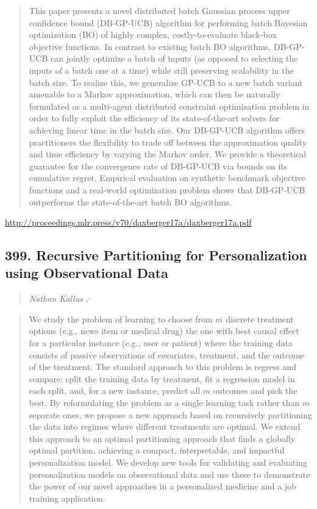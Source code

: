 \documentclass{article}
\begin{document}
\begin{quote}
    This paper presents a novel distributed batch Gaussian process upper confidence bound (DB-GP-UCB) algorithm for performing batch Bayesian optimization (BO) of highly complex, costly-to-evaluate black-box objective functions. In contrast to existing batch BO algorithms, DB-GP-UCB can jointly optimize a batch of inputs (as opposed to selecting the inputs of a batch one at a time) while still preserving scalability in the batch size. To realize this, we generalize GP-UCB to a new batch variant amenable to a Markov approximation, which can then be naturally formulated as a multi-agent distributed constraint optimization problem in order to fully exploit the efficiency of its state-of-the-art solvers for achieving linear time in the batch size. Our DB-GP-UCB algorithm offers practitioners the flexibility to trade off between the approximation quality and time efficiency by varying the Markov order. We provide a theoretical guarantee for the convergence rate of DB-GP-UCB via bounds on its cumulative regret. Empirical evaluation on synthetic benchmark objective functions and a real-world optimization problem shows that DB-GP-UCB outperforms the state-of-the-art batch BO algorithms.  \end{quote}

\href{http://proceedings.mlr.press/v70/daxberger17a/daxberger17a.pdf}{http://proceedings.mlr.press/v70/daxberger17a/daxberger17a.pdf}

\subsection{399. Recursive Partitioning for Personalization using Observational Data}

\begin{quote}
\footnotesize{\textit{Nathan Kallus ;}}
\end{quote}

\begin{quote}
    We study the problem of learning to choose from $m$ discrete treatment options (e.g., news item or medical drug) the one with best causal effect for a particular instance (e.g., user or patient) where the training data consists of passive observations of covariates, treatment, and the outcome of the treatment. The standard approach to this problem is regress and compare: split the training data by treatment, fit a regression model in each split, and, for a new instance, predict all $m$ outcomes and pick the best. By reformulating the problem as a single learning task rather than $m$ separate ones, we propose a new approach based on recursively partitioning the data into regimes where different treatments are optimal. We extend this approach to an optimal partitioning approach that finds a globally optimal partition, achieving a compact, interpretable, and impactful personalization model. We develop new tools for validating and evaluating personalization models on observational data and use these to demonstrate the power of our novel approaches in a personalized medicine and a job training application.  \end{quote}
\end{document}
